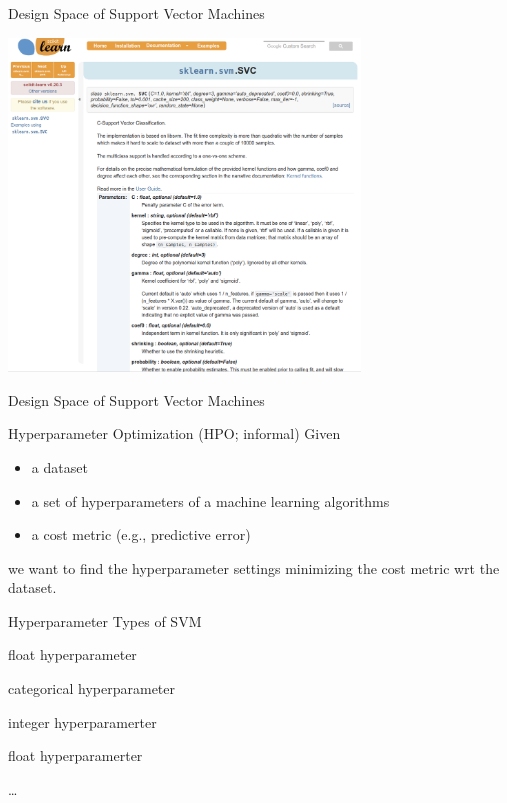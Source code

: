 \begin{frame}[c]{Design Space of Support Vector Machines}

\centering
\includegraphics[width=0.7\textwidth]{images/sklearn_svm_doc.png}

\end{frame}
\begin{frame}[c]{Design Space of Support Vector Machines}

\begin{block}{Hyperparameter Optimization (HPO; informal)}
Given
\begin{itemize}
  \item a dataset
  \item a set of hyperparameters of a machine learning algorithms
  \item a cost metric (e.g., predictive error)
\end{itemize}
we want to find the hyperparameter settings minimizing the cost metric wrt the dataset. 
\end{block}

\begin{block}{Hyperparameter Types of SVM}
\begin{description}
  \item[C] float hyperparameter
  \item[Kernel] categorical hyperparameter
  \item[Degree] integer hyperparamerter
  \item[gamma] float hyperparamerter
  \item \ldots
\end{description}
\end{block}

\end{frame}

